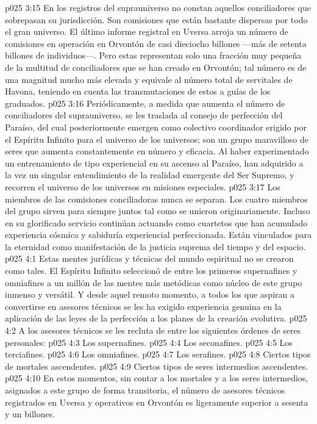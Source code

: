 \vs p025 3:15 En los registros del suprauniverso no constan aquellos conciliadores que sobrepasan su jurisdicción. Son comisiones que están bastante dispersas por todo el gran universo. El último informe registral en Uversa arroja un número de comisiones en operación en Orvontón de casi dieciocho billones ---más de setenta billones de individuos---. Pero estas representan solo una fracción muy pequeña de la multitud de conciliadores que se han creado en Orvontón; tal número es de una magnitud mucho más elevada y equivale al número total de servitales de Havona, teniendo en cuenta las transmutaciones de estos a guías de los graduados.
\vs p025 3:16 Periódicamente, a medida que aumenta el número de conciliadores del suprauniverso, se les traslada al consejo de perfección del Paraíso, del cual posteriormente emergen como colectivo coordinador erigido por el Espíritu Infinito para el universo de los universos; son un grupo maravilloso de seres que aumenta constantemente en número y eficacia. Al haber experimentado un entrenamiento de tipo experiencial en su ascenso al Paraíso, han adquirido a la vez un singular entendimiento de la realidad emergente del Ser Supremo, y recorren el universo de los universos en misiones especiales.
\vs p025 3:17 Los miembros de las comisiones conciliadoras nunca se separan. Los cuatro miembros del grupo sirven para siempre juntos tal como se unieron originariamente. Incluso en su glorificado servicio continúan actuando como cuartetos que han acumulado experiencia cósmica y sabiduría experiencial perfeccionada. Están vinculados para la eternidad como manifestación de la justicia suprema del tiempo y del espacio.
\vs p025 4:1 Estas mentes jurídicas y técnicas del mundo espiritual no se crearon como tales. El Espíritu Infinito seleccionó de entre los primeros supernafines y omniafines a un millón de las mentes más metódicas como núcleo de este grupo inmenso y versátil. Y desde aquel remoto momento, a todos los que aspiran a convertirse en asesores técnicos se les ha exigido experiencia genuina en la aplicación de las leyes de la perfección a los planes de la creación evolutiva.
\vs p025 4:2 \pc A los asesores técnicos se les recluta de entre los siguientes órdenes de seres personales:
\vs p025 4:3 Los supernafines.
\vs p025 4:4 Los seconafines.
\vs p025 4:5 Los terciafines.
\vs p025 4:6 Los omniafines.
\vs p025 4:7 Los serafines.
\vs p025 4:8 Ciertos tipos de mortales ascendentes.
\vs p025 4:9 Ciertos tipos de seres intermedios ascendentes.
\vs p025 4:10 \pc En estos momentos, sin contar a los mortales y a los seres intermedios, asignados a este grupo de forma transitoria, el número de asesores técnicos registrados en Uversa y operativos en Orvontón es ligeramente superior a sesenta y un billones.
